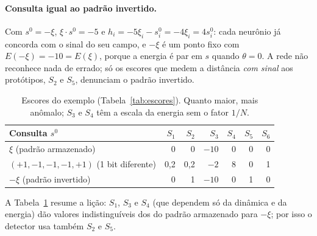 \paragraph{Consulta igual ao padrão invertido.} Com $s^0=-\xi$, $\xi\cdot s^0=-5$ e
$h_i=-5\xi_i-s^0_i=-4\xi_i=4s^0_i$: cada neurônio já concorda com o sinal do seu campo, e $-\xi$ é um ponto fixo
com $E(-\xi)=-10=E(\xi)$, porque a energia é par em $s$ quando $\theta=0$. A rede não reconhece nada de errado;
só os escores que medem a distância \emph{com sinal} aos protótipos, $S_2$ e $S_5$, denunciam o padrão invertido.

\begin{table}[htbp]
\centering
\caption{Escores do exemplo (Tabela~\ref{tab:escores}). Quanto maior, mais anômalo; $S_3$ e $S_4$ têm a escala da
energia sem o fator $1/N$.}
\label{tab:ex-escores}
\small
\begin{tabular}{@{}lrrrrrr@{}}
\toprule
Consulta $s^0$ & $S_1$ & $S_2$ & $S_3$ & $S_4$ & $S_5$ & $S_6$\\
\midrule
$\xi$ (padrão armazenado) & 0 & 0 & $-10$ & 0 & 0 & 0\\
$(+1,-1,-1,-1,+1)$ (1 bit diferente) & 0,2 & 0,2 & $-2$ & 8 & 0 & 1\\
$-\xi$ (padrão invertido) & 0 & 1 & $-10$ & 0 & 1 & 0\\
\bottomrule
\end{tabular}
\end{table}

\noindent A Tabela~\ref{tab:ex-escores} resume a lição: $S_1$, $S_3$ e $S_4$ (que dependem só da dinâmica e da energia) dão
valores indistinguíveis dos do padrão armazenado para $-\xi$; por isso o detector usa também $S_2$ e $S_5$.

